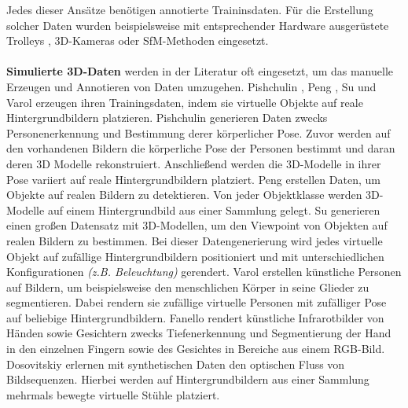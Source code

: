 Jedes dieser Ansätze benötigen annotierte Traininsdaten. Für die Erstellung solcher Daten wurden beispielsweise mit entsprechender Hardware ausgerüstete Trolleys \cite{huitlTUMindoorExtensiveImage2012}, 3D-Kameras \cite{izadiKinectFusionRealtime3D2011} oder SfM-Methoden \cite{kendallPoseNetConvolutionalNetwork2015} eingesetzt.
\\\\
\textbf{Simulierte 3D-Daten} werden in der Literatur oft eingesetzt, um das manuelle Erzeugen und Annotieren von Daten umzugehen. Pishchulin \etal\cite{pishchulinArticulatedPeopleDetection2012a}, Peng \etal\cite{pengLearningDeepObject2014}, Su \etal\cite{suRenderCNNViewpoint2015} und Varol \etal\cite{varolLearningSyntheticHumans2017} erzeugen ihren Trainingsdaten, indem sie virtuelle Objekte auf reale Hintergrundbildern platzieren. Pishchulin \etal\cite{pishchulinArticulatedPeopleDetection2012a} generieren Daten zwecks Personenerkennung und Bestimmung derer körperlicher Pose. Zuvor werden auf den vorhandenen Bildern die körperliche Pose der Personen bestimmt und daran deren 3D Modelle rekonstruiert. Anschließend werden die 3D-Modelle in ihrer Pose variiert auf reale Hintergrundbildern platziert. Peng \etal\cite{pengLearningDeepObject2014} erstellen Daten, um Objekte auf realen Bildern zu detektieren. Von jeder Objektklasse werden 3D-Modelle auf einem Hintergrundbild aus einer Sammlung gelegt. Su \etal\cite{suRenderCNNViewpoint2015} generieren einen großen Datensatz mit 3D-Modellen, um den Viewpoint von Objekten auf realen Bildern zu bestimmen. Bei dieser Datengenerierung wird jedes virtuelle Objekt auf zufällige Hintergrundbildern positioniert und mit unterschiedlichen Konfigurationen \textit{(z.B. Beleuchtung)} gerendert. 
Varol \etal\cite{varolLearningSyntheticHumans2017} erstellen künstliche Personen auf Bildern, um beispielsweise den menschlichen Körper in seine Glieder zu segmentieren. Dabei rendern sie zufällige virtuelle Personen mit zufälliger Pose auf beliebige Hintergrundbildern.
Fanello \etal\cite{fanelloLearningBeDepth2014} rendert künstliche Infrarotbilder von Händen sowie Gesichtern zwecks Tiefenerkennung und Segmentierung der Hand in den einzelnen Fingern sowie des Gesichtes in Bereiche aus einem RGB-Bild.
Dosovitskiy \etal\cite{dosovitskiyFlowNetLearningOptical2015} erlernen mit synthetischen Daten den optischen Fluss von Bildsequenzen.  Hierbei werden auf Hintergrundbildern aus einer Sammlung mehrmals bewegte virtuelle Stühle platziert.

